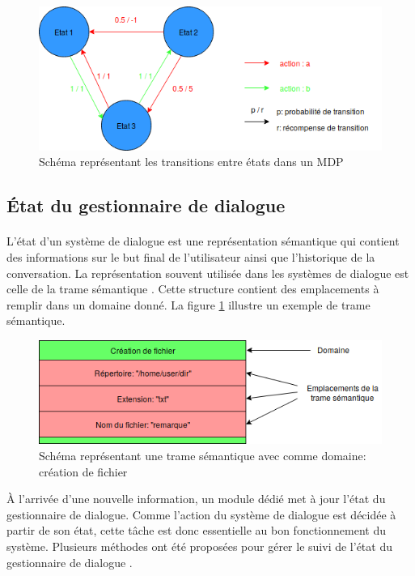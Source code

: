 \begin{figure}[H]
	\centering
	\includegraphics[width=.95\linewidth]{images/DM/MDP.png} 
	\caption{Schéma représentant les transitions entre états dans un MDP} 
\end{figure}


\subsection{État du gestionnaire de dialogue}\label{trame}
\paragraph{}
L'état d'un système de dialogue est une représentation sémantique qui contient des informations sur le but final de l'utilisateur ainsi que l'historique de la conversation. La représentation souvent utilisée dans les systèmes de dialogue est celle de la trame sémantique \citep{Chen2017}. Cette structure contient des emplacements à remplir dans un domaine donné. La figure \ref{SFrame} illustre un exemple de trame sémantique.\newline
\begin{figure}[H]
	\centering
	\includegraphics[width=.7\linewidth]{images/DM/SFrame.png} 
	\caption{Schéma représentant une trame sémantique avec comme domaine: création de fichier} 
	\label{SFrame}
\end{figure}


À l'arrivée d'une nouvelle information, un module dédié met à jour l'état du gestionnaire de dialogue. Comme l'action du système de dialogue est décidée à partir de son état, cette tâche est donc essentielle au bon fonctionnement du système. Plusieurs méthodes ont été proposées pour gérer le suivi de l'état du gestionnaire de dialogue \citep{Williams2007}.
